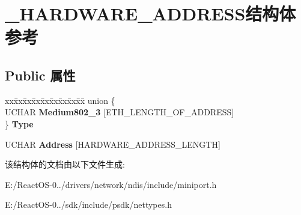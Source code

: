 \hypertarget{struct___h_a_r_d_w_a_r_e___a_d_d_r_e_s_s}{}\section{\+\_\+\+H\+A\+R\+D\+W\+A\+R\+E\+\_\+\+A\+D\+D\+R\+E\+S\+S结构体 参考}
\label{struct___h_a_r_d_w_a_r_e___a_d_d_r_e_s_s}
\subsection*{Public 属性}
\begin{DoxyCompactItemize}
\item 
\mbox{\label{struct___h_a_r_d_w_a_r_e___a_d_d_r_e_s_s_a9c6eee49f4ee559538f1878d65dbb1c3}} 
\begin{tabbing}
xx\=xx\=xx\=xx\=xx\=xx\=xx\=xx\=xx\=\kill
union \{\\
\>UCHAR {\bfseries Medium802\_3} \mbox{[}ETH\_LENGTH\_OF\_ADDRESS\mbox{]}\\
\} {\bfseries Type}\\

\end{tabbing}\item 
\mbox{\label{struct___h_a_r_d_w_a_r_e___a_d_d_r_e_s_s_a4a9276bef6149c965377ac9e5cefb3a6}} 
U\+C\+H\+AR {\bfseries Address} \mbox{[}H\+A\+R\+D\+W\+A\+R\+E\+\_\+\+A\+D\+D\+R\+E\+S\+S\+\_\+\+L\+E\+N\+G\+TH\mbox{]}
\end{DoxyCompactItemize}


该结构体的文档由以下文件生成\+:\begin{DoxyCompactItemize}
\item 
E\+:/\+React\+O\+S-\/0../drivers/network/ndis/include/miniport.\+h\item 
E\+:/\+React\+O\+S-\/0../sdk/include/psdk/nettypes.\+h\end{DoxyCompactItemize}
